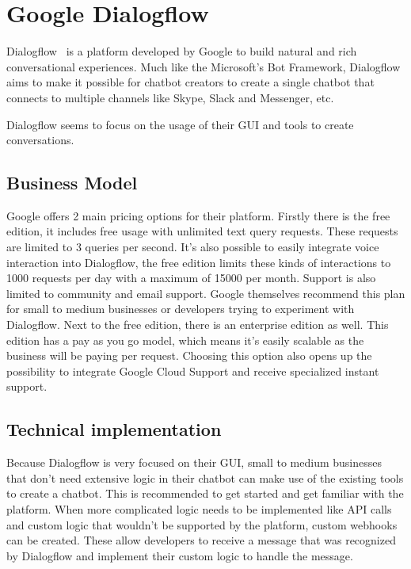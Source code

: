 \chapter{Google Dialogflow}

Dialogflow~\cite{dialogflow} is a platform developed by Google to build natural and rich conversational experiences. Much like the Microsoft's Bot Framework, Dialogflow aims to make it possible for chatbot creators to create a single chatbot that connects to multiple channels like Skype, Slack and Messenger, etc.

Dialogflow seems to focus on the usage of their GUI and tools to create conversations.

\section{Business Model}

Google offers 2 main pricing options for their platform. Firstly there is the free edition, it includes free usage with unlimited text query requests. These requests are limited to 3 queries per second. It's also possible to easily integrate voice interaction into Dialogflow, the free edition limits these kinds of interactions to 1000 requests per day with a maximum of 15000 per month. Support is also limited to community and email support. Google themselves recommend this plan for small to medium businesses or developers trying to experiment with Dialogflow. Next to the free edition, there is an enterprise edition as well. This edition has a pay as you go model, which means it's easily scalable as the business will be paying per request. Choosing this option also opens up the possibility to integrate Google Cloud Support and receive specialized instant support.

\section{Technical implementation}

Because Dialogflow is very focused on their GUI, small to medium businesses that don't need extensive logic in their chatbot can make use of the existing tools to create a chatbot. This is recommended to get started and get familiar with the platform. When more complicated logic needs to be implemented like API calls and custom logic that wouldn't be supported by the platform, custom \Gls{webhook}s can be created. These allow developers to receive a message that was recognized by Dialogflow and implement their custom logic to handle the message.

